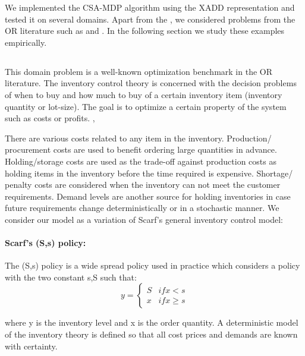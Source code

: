 \label{sec:results}
 
We implemented the CSA-MDP algorithm using the XADD representation and tested it on several domains. Apart from the \MarsRoverNL, we considered problems from the OR
literature such as \InventoryControl and \WaterReservoir. In the following
section we study these examples empirically.
 

\subsection{\InventoryControl}
This domain problem is a well-known optimization benchmark in the OR
literature. The inventory control theory is concerned with the decision problems of when to buy and how much to buy of a certain inventory item (inventory quantity or lot-size). The goal is to optimize a certain property of the system such as costs or profits. \cite{Scarf2002}, \cite{Scarf_Karlin58} 

There are various costs related to any item in the inventory. Production/ procurement costs are used to benefit ordering large quantities in advance. Holding/storage costs are used as the trade-off against production costs as holding items in the inventory before the time required is expensive. Shortage/ penalty costs are considered when the inventory can not meet the customer requirements. Demand levels are another source for holding inventories in case future requirements change deterministically or in a stochastic manner. 
We consider our model as a variation of Scarf's general inventory control model:
 
\paragraph*{Scarf's (S,s) policy:}
The (S,s) policy is a wide spread policy used in practice which considers a policy with the two constant s,S such that: 
\[y = \begin{cases}
S & if x<s \\
x & if x \geq s
\end{cases}\]

where y is the inventory level and x is the order quantity.  A deterministic model of the inventory theory is defined so that all cost prices and demands are known with certainty. 

